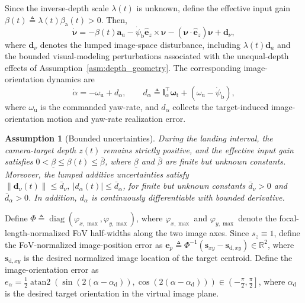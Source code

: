 \documentclass[10pt,conference]{IEEEtran}
\newtheorem{assumption}{Assumption}
\begin{document}
Since the inverse-depth scale $\lambda(t)$ is unknown, define the effective input gain $\beta(t) \triangleq\lambda(t)\beta_{\mathrm{a}}(t)>0$. Then,
\begin{equation}
    \dot{\boldsymbol{\nu}} = -\beta(t)\boldsymbol{a}_{\mathrm{u}} -\dot{\psi}_{\mathrm{b}}
    \hat{\boldsymbol{e}}_{z}\times\boldsymbol{\nu} -(\boldsymbol{\nu}\cdot\hat{\boldsymbol{e}}_{z})\boldsymbol{\nu} + \boldsymbol{d}_{\nu},
    \label{uncertain image velocity dynamics: equation}
\end{equation}
where $\boldsymbol d_\nu$ denotes the lumped image-space disturbance, including $\lambda(t)\boldsymbol d_a$ and the bounded visual-modeling perturbations associated with the unequal-depth effects of Assumption~\ref{asm:depth_geometry}.
The corresponding image-orientation dynamics are
\begin{equation}
    \dot{\alpha} = -\omega_{\mathrm{u}} + d_{\alpha}, \qquad
    d_{\alpha} \triangleq \boldsymbol l_\alpha^\top \boldsymbol\omega_{\mathrm t} + (\omega_{\mathrm{u}} - \dot{\psi}_{\mathrm{b}}),
    \label{uncertain image orientation dynamics: equation}
\end{equation}
where $\omega_{\mathrm{u}}$ is the commanded yaw-rate, and $d_{\alpha}$ collects the target-induced image-orientation motion and yaw-rate realization error.

\begin{assumption}[Bounded uncertainties]
\label{asm:uncertainty}
During the landing interval, the camera-target depth $z(t)$ remains strictly positive, and the effective input gain satisfies $0<\underline{\beta} \leq \beta(t) \leq \overline{\beta}$, where $\underline{\beta}$ and $\overline{\beta}$ are finite but unknown constants. Moreover, the lumped additive uncertainties satisfy $\|\boldsymbol{d}_{\nu}(t)\| \leq \bar{d}_{\nu}, ~ |d_{\alpha}(t)| \leq \bar{d}_{\alpha}$, for finite but unknown constants $\bar{d}_{\nu}>0$ and $\bar{d}_{\alpha}>0$. In addition, $d_{\alpha}$ is continuously differentiable with bounded derivative.
\end{assumption}

Define $\Phi \triangleq \operatorname{diag} \left( \varphi_{x,\max}, \varphi_{y,\max} \right)$, where $\varphi_{x,\max}$ and $\varphi_{y,\max}$ denote the focal-length-normalized FoV half-widths along the two image axes.
Since $s_z\equiv1$, define the FoV-normalized image-position error as $\boldsymbol{e}_{p} \triangleq \Phi^{-1} \left( \boldsymbol{s}_{xy} - \boldsymbol{s}_{\mathrm{d},xy} \right) \in\mathbb{R}^{2}$, where $\boldsymbol{s}_{\mathrm{d},xy}$ is the desired normalized image location of the target centroid.
Define the image-orientation error as $e_{\alpha} = \frac{1}{2} \operatorname{atan2} \left(\sin\!\left(2(\alpha-\alpha_{\mathrm{d}})\right),\cos\!\left(2(\alpha-\alpha_{\mathrm{d}})\right)\right)\in\left(-\frac{\pi}{2},\frac{\pi}{2}\right]$, where $\alpha_{\mathrm{d}}$ is the desired target orientation in the virtual image plane.
\end{document}
